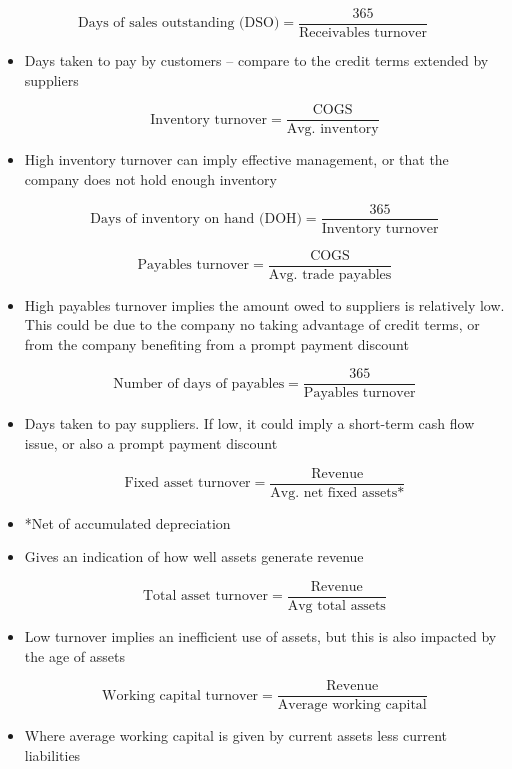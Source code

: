 \documentclass[../notes_compiled.tex]{subfiles}
\begin{document}
\begin{equation*}
\text{Days of sales outstanding (DSO)} = \frac{365}{\text{Receivables turnover}}
\end{equation*}
\begin{itemize}
\item Days taken to pay by customers -- compare to the credit terms extended by suppliers

\begin{equation*}
\text{Inventory turnover} = \frac{\text{COGS}}{\text{Avg. inventory}}
\end{equation*}
\item High inventory turnover can imply effective management, or that the company does not hold enough inventory

\begin{equation*}
\text{Days of inventory on hand (DOH)} = \frac{365}{\text{Inventory turnover}}
\end{equation*}

\begin{equation*}
\text{Payables turnover} = \frac{\text{COGS}}{\text{Avg. trade payables}}
\end{equation*}
\item High payables turnover implies the amount owed to suppliers is relatively low. This could be due to the company no taking advantage of credit terms, or from the company benefiting from a prompt payment discount

\begin{equation*}
\text{Number of days of payables} = \frac{365}{\text{Payables turnover}}
\end{equation*}
\item Days taken to pay suppliers. If low, it could imply a short-term cash flow issue, or also a prompt payment discount

\begin{equation*}
\text{Fixed asset turnover} = \frac{\text{Revenue}}{\text{Avg. net fixed assets*}}
\end{equation*}
\item[] *Net of accumulated depreciation
\item Gives an indication of how well assets generate revenue

\begin{equation*}
\text{Total asset turnover} = \frac{\text{Revenue}}{\text{Avg total assets}}
\end{equation*}
\item Low turnover implies an inefficient use of assets, but this is also impacted by the age of assets

\begin{equation*}
\text{Working capital turnover} = \frac{\text{Revenue}}{\text{Average working capital}}
\end{equation*}
\item Where average working capital is given by current assets less current liabilities


\end{itemize}
\end{document}
